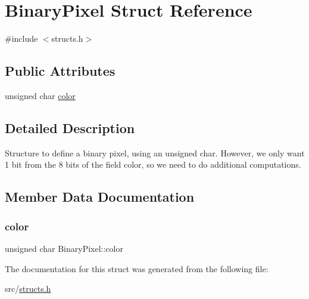 \hypertarget{structBinaryPixel}{}\section{Binary\+Pixel Struct Reference}
\label{structBinaryPixel}


{\ttfamily \#include $<$structs.\+h$>$}

\subsection*{Public Attributes}
\begin{DoxyCompactItemize}
\item 
unsigned char \hyperlink{structBinaryPixel_ad757dfcdc7f0fae97a0ae2a536ed6d8a}{color}
\end{DoxyCompactItemize}


\subsection{Detailed Description}
Structure to define a binary pixel, using an unsigned char. However, we only want 1 bit from the 8 bits of the field \textquotesingle{}color\textquotesingle{}, so we need to do additional computations. 

\subsection{Member Data Documentation}
\mbox{\label{structBinaryPixel_ad757dfcdc7f0fae97a0ae2a536ed6d8a}} 
\subsubsection{\texorpdfstring{color}{color}}
{\footnotesize\ttfamily unsigned char Binary\+Pixel\+::color}



The documentation for this struct was generated from the following file\+:\begin{DoxyCompactItemize}
\item 
src/\hyperlink{structs_8h}{structs.\+h}\end{DoxyCompactItemize}
